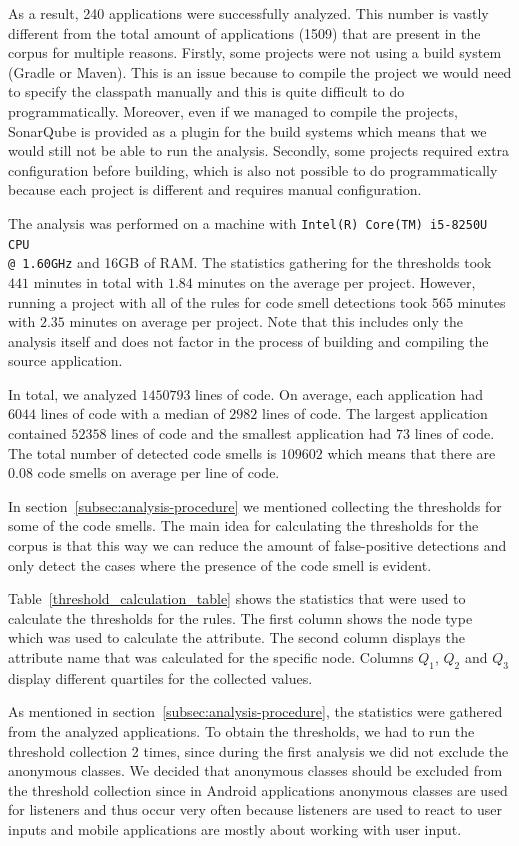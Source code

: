 
As a result, 240 applications were successfully analyzed.
This number is vastly different from the total amount of applications (1509) that are present in the corpus for multiple reasons.
Firstly, some projects were not using a build system (Gradle or Maven).
This is an issue because to compile the project we would need to specify the classpath manually and
this is quite difficult to do programmatically.
Moreover, even if we managed to compile the projects, SonarQube is provided as a plugin for the build systems which means
that we would still not be able to run the analysis.
Secondly, some projects required extra configuration before building, which is also not possible to do
programmatically because each project is different and requires manual configuration.

The analysis was performed on a machine with \verb|Intel(R) Core(TM) i5-8250U CPU| \\ \verb|@ 1.60GHz| and 16GB of RAM\@.
The statistics gathering for the thresholds took $441$ minutes in total with $1.84$ minutes on the average per project.
However, running a project with all of the rules for code smell detections took $565$ minutes with $2.35$ minutes on average per project.
Note that this includes only the analysis itself and does not factor in the process of building and compiling the source
application.

In total, we analyzed $1450793$ lines of code.
On average, each application had $6044$ lines of code with a median of $2982$ lines of code.
The largest application contained $52358$ lines of code and the smallest application had $73$ lines of code.
The total number of detected code smells is $109602$ which means that there are $0.08$ code smells on average per line of code.

In section~\ref{subsec:analysis-procedure} we mentioned collecting the thresholds for some of the code smells.
The main idea for calculating the thresholds for the corpus is that this way we can reduce
the amount of false-positive detections and only detect the cases where the presence of the code smell is evident.

Table~\ref{threshold_calculation_table} shows the statistics that were used to calculate the thresholds for the rules.
The first column shows the node type which was used to calculate the attribute.
The second column displays the attribute name that was calculated for the specific node.
Columns $Q_1$, $Q_2$ and $Q_3$ display different quartiles for the collected values.

As mentioned in section~\ref{subsec:analysis-procedure}, the statistics were gathered from the analyzed applications.
To obtain the thresholds, we had to run the threshold collection 2 times, since during the first analysis
we did not exclude the anonymous classes.
We decided that anonymous classes should be excluded from the threshold collection since in Android applications
anonymous classes are used for listeners and thus occur very often because listeners are used to react to
user inputs and mobile applications are mostly about working with user input.

